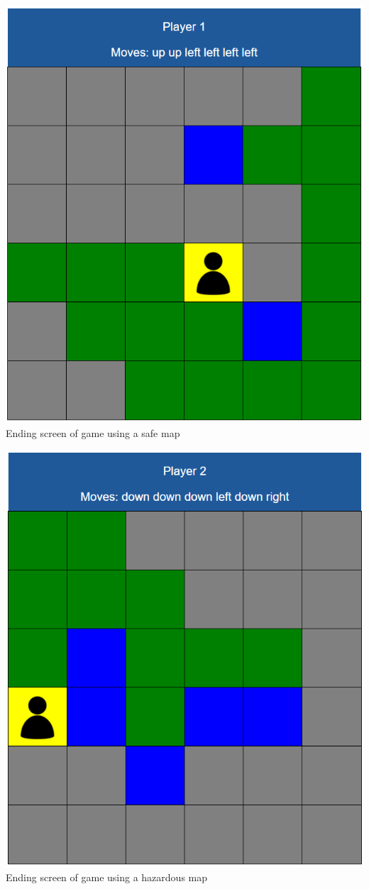\documentclass[a4paper,12pt]{extarticle}
\begin{document}
\begin{center}
\includegraphics[scale=0.5]{Figure2.png}\\
Ending screen of game using a safe map
\end{center}

\begin{center}
\includegraphics[scale=0.5]{Figure3.png}\\
Ending screen of game using a hazardous map
\end{center}
\end{document}
